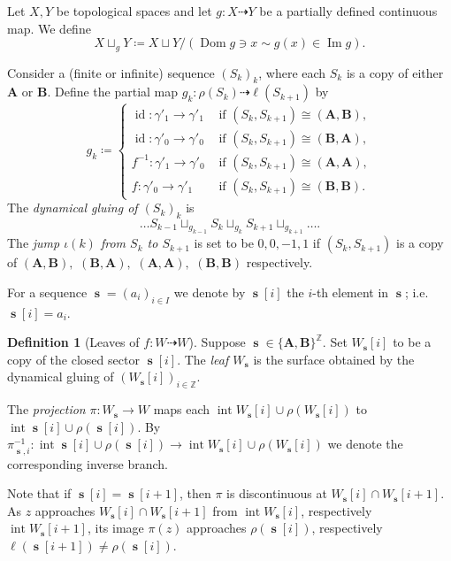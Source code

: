 \documentclass[]{amsart}
\newcommand{\Dom}{\operatorname {Dom}}
\renewcommand{\Im}{\operatorname {Im}}
\newcommand\intr{\operatorname{int}}
\newcommand\seq{{\operatorname{\mathbf s}}}
\newcommand{\A}{\mathbf A}
\newcommand{\B}{\mathbf B}
\newcommand{\Z}{\mathbb{Z}}
\theoremstyle{remark}
\numberwithin{equation}{section}
\theoremstyle{definition}
\newtheorem{defn}[thm]{Definition}
\newcommand{\id}{\operatorname{id}}
\begin{document}
Let $X,Y$ be topological spaces and let $g\colon X\dashrightarrow Y$ be a partially defined continuous map. We define
\[X\sqcup_g Y\coloneqq  X\sqcup Y/ (\Dom g \ni x\sim g(x)\in \Im g).\] 

Consider a (finite or infinite) sequence $(S_k)_k$, where each $S_k$ is a copy of either $\A$ or $\B$. Define the partial map $g_k\colon \rho(S_k)\dashrightarrow \ell(S_{k+1})$ by
\begin{equation}
\label{eq:deff:g_k}
    g_k\coloneqq \begin{cases}
    \id \colon \gamma'_1\to \gamma'_1& \text{ if } (S_k,S_{k+1})\cong (\A,\B),\\
        \id \colon \gamma'_0\to \gamma'_0& \text{ if } (S_k,S_{k+1})\cong (\B,\A),\\
        f^{-1} \colon \gamma'_1\to \gamma'_0& \text{ if } (S_k,S_{k+1})\cong (\A,\A),\\
          f \colon \gamma'_0\to \gamma'_1& \text{ if } (S_k,S_{k+1})\cong (\B,\B).
    \end{cases}
\end{equation} The \emph{dynamical gluing of  $(S_k)_k$} is \[\dots S_{k-1} \sqcup_{g_{k-1}} S_k \sqcup_{g_k} S_{k+1}\sqcup_{g_{k+1}} \dots.\] The \emph{jump $\iota(k)$ from $S_{k} $ to $S_{k+1}$} is set to be $0,0,-1,1$ if $(S_k,S_{k+1})$ is a copy of $(\A,\B),$ $(\B,\A),$ $(\A,\A),$ $(\B,\B)$ respectively.





  For a sequence $\seq=(a_i)_{i\in I}$ we denote by $\seq[i]$ the $i$-th element in $\seq$; i.e.~$\seq[i]=a_i$.
\begin{defn}[Leaves of $f\colon W\dashrightarrow W$]
\label{defn:leaf over f}
Suppose $\seq \in \{\A,\B\}^{\Z}$. Set $W_{\seq}[i]$ to be a copy of the closed sector $\seq[i]$. The \emph{leaf $W_{\seq}$} is the surface obtained by the dynamical gluing of $(W_{\seq}[i])_{i\in \Z}$.

The \emph{projection} $\pi\colon W_{\seq} \to W$ maps each $\intr W_{\seq}[i] \cup \rho(W_\seq[i])$ to $\intr \seq[i]\cup \rho(\seq[i])$. By $\pi^{-1}_{\seq,i}\colon \intr \seq[i]\cup \rho(\seq[i]) \to \intr W_{\seq}[i] \cup \rho(W_\seq[i])$ we denote the corresponding inverse branch.
\end{defn}


 Note that if $\seq[i]=\seq[i+1]$, then $\pi$ is discontinuous at $W_\seq[i]\cap W_\seq[i+1]$. As $z$ approaches $W_\seq[i]\cap W_\seq[i+1]$ from $\intr W_\seq[i]$, respectively $\intr W_\seq[i+1]$, its image $\pi(z)$ approaches $\rho(\seq[i])$, respectively $\ell(\seq[i+1])\not = \rho(\seq[i])$.   
\end{document}

